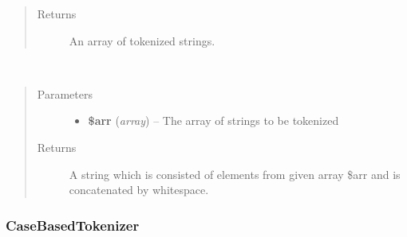 \documentclass[letterpaper,10pt,english]{sphinxmanual}
\begin{document}
\begin{fulllineitems}
\begin{fulllineitems}
\begin{quote}
\begin{description}
\item[{Returns}] \leavevmode
An array of tokenized strings.

\end{description}\end{quote}

\end{fulllineitems}


\begin{fulllineitems}
\label{docs/api:Tokenizer::arrayToString}~\begin{quote}\begin{description}
\item[{Parameters}] \leavevmode\begin{itemize}
\item {} 
\textbf{\$arr} (\emph{array}) -- The array of strings to be tokenized

\end{itemize}

\item[{Returns}] \leavevmode
A string which is consisted of elements from given array \$arr and is concatenated by whitespace.

\end{description}\end{quote}

\end{fulllineitems}


\end{fulllineitems}



\subsubsection{CaseBasedTokenizer}
\label{docs/api:casebasedtokenizer}
\end{document}
